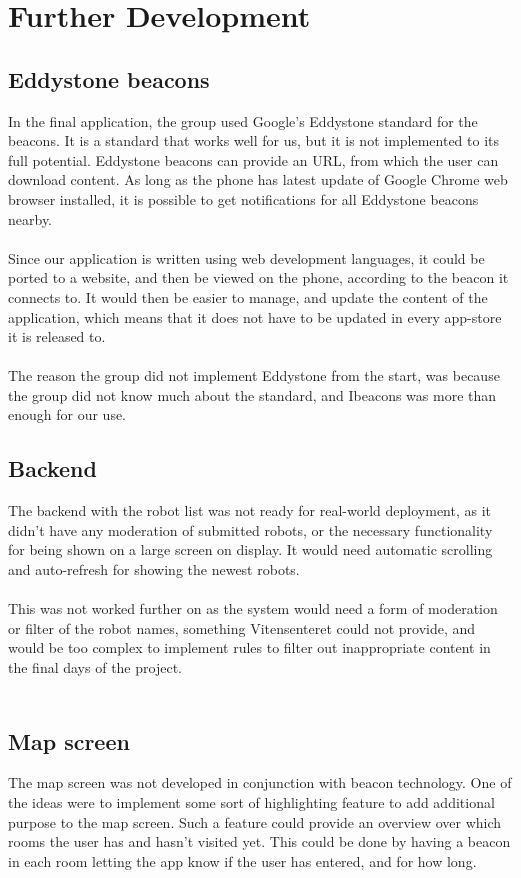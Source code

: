 \chapter{Further Development}

\section{Eddystone beacons}
In the final application, the group used Google's Eddystone standard for the beacons. It is a standard that works well for us, but it is not implemented to its full potential. Eddystone beacons can provide an URL, from which the user can download content. As long as the phone has latest update of Google Chrome web browser installed, it is possible to get notifications for all Eddystone beacons nearby.
\\\\
Since our application is written using web development languages, it could be ported to a website, and then be viewed on the phone, according to the beacon it connects to. It would then be easier to manage, and update the content of the application, which means that it does not have to be updated in every app-store it is released to.
\\\\
The reason the group did not implement Eddystone from the start, was because the group did not know much about the standard, and Ibeacons was more than enough for our use.


\section{Backend}
The backend with the robot list was not ready for real-world deployment, as it didn't have any moderation of submitted robots, or the necessary functionality for being shown on a large screen on display. It would need automatic scrolling and auto-refresh for showing the newest robots.\\
\\
This was not worked further on as the system would need a form of moderation or filter of the robot names, something Vitensenteret could not provide, and would be too complex to implement rules to filter out inappropriate content in the final days of the project.
\\\\
\section{Map screen}
The map screen was not developed in conjunction with beacon technology. One of the ideas were to implement some sort of highlighting feature to add additional purpose to the map screen. Such a feature could provide an overview over which rooms the user has and hasn't visited yet. This could be done by having a beacon in each room letting the app know if the user has entered, and for how long.

